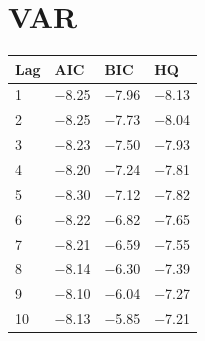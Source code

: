 \documentclass{article}
\begin{document}
\section{VAR}

\begin{tabular}{llll}
\toprule
Lag & AIC & BIC & HQ \\
\midrule
1 & $-$8.25 & $-$7.96 & $-$8.13 \\
2 & $-$8.25 & $-$7.73 & $-$8.04 \\
3 & $-$8.23 & $-$7.50 & $-$7.93 \\
4 & $-$8.20 & $-$7.24 & $-$7.81 \\
5 & $-$8.30 & $-$7.12 & $-$7.82 \\
6 & $-$8.22 & $-$6.82 & $-$7.65 \\
7 & $-$8.21 & $-$6.59 & $-$7.55 \\
8 & $-$8.14 & $-$6.30 & $-$7.39 \\
9 & $-$8.10 & $-$6.04 & $-$7.27 \\
10 & $-$8.13 & $-$5.85 & $-$7.21 \\
\bottomrule
\end{tabular}
\end{document}
